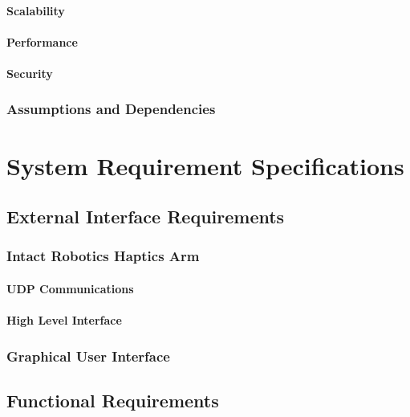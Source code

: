 \documentclass[11pt]{report}
\begin{document}
\subsubsection{Scalability}

\subsubsection{Performance}

\subsubsection{Security} 
 
\subsection{Assumptions and Dependencies}

\chapter{System Requirement Specifications}

\section{External Interface Requirements}

\subsection{Intact Robotics Haptics Arm}

\subsubsection{UDP Communications}

\subsubsection{High Level Interface}

\subsection{Graphical User Interface}


\section{Functional Requirements}
\end{document}
